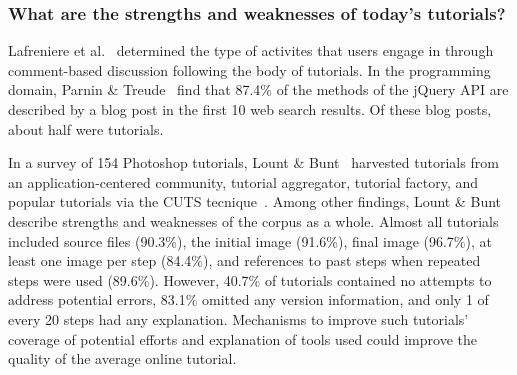 \subsubsection{What are the strengths and weaknesses of today's tutorials?}

Lafreniere et al.~\cite{lafreniere_understanding_2013} determined the type of activites that users engage in through comment-based discussion following the body of tutorials.
In the programming domain, Parnin \& Treude~\cite{parnin_measuring_2011} find that 87.4\% of the methods of the jQuery API are described by a blog post in the first 10 web search results.
Of these blog posts, about half were tutorials.

In a survey of 154 Photoshop tutorials, Lount \& Bunt~\cite{lount_characterizing_2014} harvested tutorials from an application-centered community, tutorial aggregator, tutorial factory, and popular tutorials via the CUTS tecnique~\cite{fourney_characterizing_2011}.
Among other findings, Lount \& Bunt describe strengths and weaknesses of the corpus as a whole.
Almost all tutorials included source files (90.3\%), the initial image (91.6\%), final image (96.7\%), at least one image per step (84.4\%), and references to past steps when repeated steps were used (89.6\%).
However, 40.7\% of tutorials contained no attempts to address potential errors, 83.1\% omitted any version information, and only 1 of every 20 steps had any explanation.
Mechanisms to improve such tutorials' coverage of potential efforts and explanation of tools used could improve the quality of the average online tutorial.



